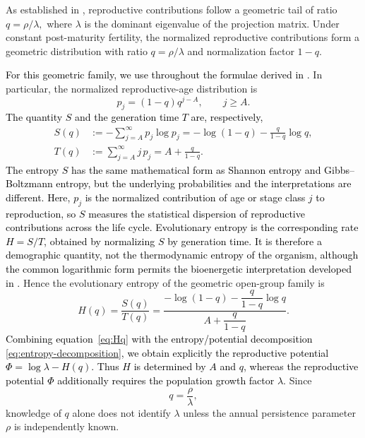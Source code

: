 \documentclass[11pt,a4paper]{amsart}
\begin{document}
As established in \cite{BuescuElaydiOliveira2026}, reproductive contributions
follow a geometric tail of ratio $
q=\rho/\lambda,$ where
$\lambda$ is the dominant eigenvalue of the projection matrix. Under constant post-maturity fertility, the normalized reproductive
contributions form a geometric distribution with ratio \(q=\rho/\lambda\)
and normalization factor \(1-q\).

\textcolor{black}{For this geometric family, we use throughout the formulae derived in
\cite{BuescuElaydiOliveira2026}.} In particular, the normalized
reproductive-age distribution is
\[
p_j=(1-q)q^{j-A},
\qquad j\geq A.
\]
\textcolor{black}{The quantity \(S\) and the generation time
\(T\) are, respectively,}
\[
\begin{aligned}
S(q)
&:=-\sum_{j=A}^{\infty}p_j\log p_j
 =-\log(1-q)-\frac{q}{1-q}\log q,
\\
T(q)
&:=\sum_{j=A}^{\infty}j\,p_j
 =A+\frac{q}{1-q}.
\end{aligned}
\]
\textcolor{black}{The entropy \(S\) has the same mathematical form as Shannon entropy and
Gibbs--Boltzmann entropy, but the underlying probabilities and the
interpretations are different. Here, \(p_j\) is the normalized contribution
of age or stage class \(j\) to reproduction, so \(S\) measures the statistical
dispersion of reproductive contributions across the life cycle. Evolutionary
entropy is the corresponding rate \(H=S/T\), obtained by normalizing $S$ by generation time. It is therefore a demographic quantity,
not the thermodynamic entropy of the organism, although the common
logarithmic form permits the bioenergetic interpretation developed in
\cite{Demetrius97,Demetrius2000,Demetrius2023SelfOrganization}.}
Hence the evolutionary {entropy} of the geometric open-group family is
\begin{equation}
\label{eq:Hq}
H(q)=\frac{S(q)}{T(q)}
=
\frac{-\log(1-q)-\dfrac{q}{1-q}\log q}
     {A+\dfrac{q}{1-q}}.
\end{equation}
\textcolor{black}{ Combining equation~\eqref{eq:Hq} with the entropy/potential decomposition
\eqref{eq:entropy-decomposition}, we obtain explicitly the reproductive
potential \(\Phi=\log\lambda-H(q)\).
Thus \(H\) is determined by \(A\) and \(q\), whereas the reproductive
potential \(\Phi\) additionally requires the population growth factor
\(\lambda\).} Since
\[
q=\frac{\rho}{\lambda},
\]
knowledge of \(q\) alone does not identify \(\lambda\) unless the
annual persistence parameter \(\rho\) is independently known.
\end{document}
